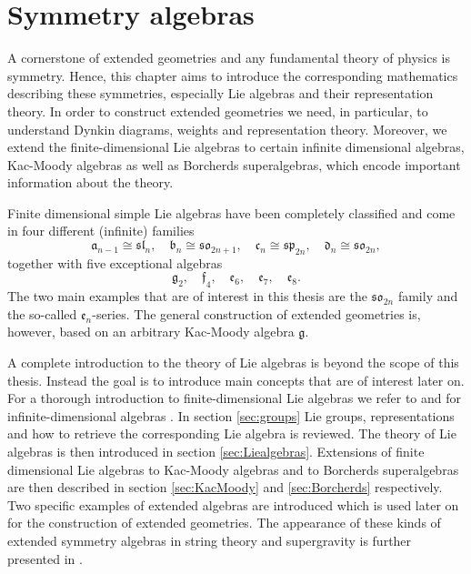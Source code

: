 \chapter{Symmetry algebras}\label{chap:symmetries}
A cornerstone of extended geometries and any fundamental theory of physics is symmetry. Hence, this chapter aims to introduce the corresponding mathematics describing these symmetries, especially Lie algebras and their representation theory. In order to construct extended geometries we need, in particular, to understand Dynkin diagrams, weights and representation theory. Moreover, we extend the finite-dimensional Lie algebras to certain infinite dimensional algebras, Kac-Moody algebras as well as Borcherds superalgebras, which encode important information about the theory. 

Finite dimensional simple Lie algebras have been completely classified and come in four different (infinite) families 
\begin{equation*}
    \mathfrak{a}_{n-1} \cong \mathfrak{sl}_{n},\quad \mathfrak{b}_{n}\cong \mathfrak{so}_{2n+1},\quad \mathfrak{c}_{n} \cong \mathfrak{sp}_{2n},\quad \mathfrak{d}_{n}\cong \mathfrak{so}_{2n},
\end{equation*}
together with five exceptional algebras
\begin{equation*}
    \mathfrak{g}_2,\quad \mathfrak{f}_4,\quad\mathfrak{e_6},\quad \mathfrak{e_7},\quad \mathfrak{e_8}.
\end{equation*}
The two main examples that are of interest in this thesis are the $\mathfrak{so}_{2n}$ family and the so-called $\mathfrak{e}_n$-series. The general construction of extended geometries is, however, based on an arbitrary Kac-Moody algebra $\mathfrak{g}$. 

A complete introduction to the theory of Lie algebras is beyond the scope of this thesis. Instead the goal is to introduce main concepts that are of interest later on. For a thorough introduction to finite-dimensional Lie algebras we refer to \cite{Fuchs1997,FultonHarris2004,Gaberdiel2013} and for infinite-dimensional algebras \cite{Kac1990}. In section \ref{sec:groups} Lie groups, representations and how to retrieve the corresponding Lie algebra is reviewed. The theory of Lie algebras is then introduced in section \ref{sec:Liealgebras}. Extensions of finite dimensional Lie algebras to Kac-Moody algebras and to Borcherds superalgebras are then described in section \ref{sec:KacMoody} and \ref{sec:Borcherds} respectively. Two specific examples of extended algebras are introduced which is used later on for the construction of extended geometries. The appearance of these kinds of extended symmetry algebras in string theory and supergravity is further presented in \cite{CederwallPalmkvistSuperalgebras2015,Aldazabal2014,Palmkvist2015ExpGeomSuperAlg,deWitTensorHierarchies2008}.



